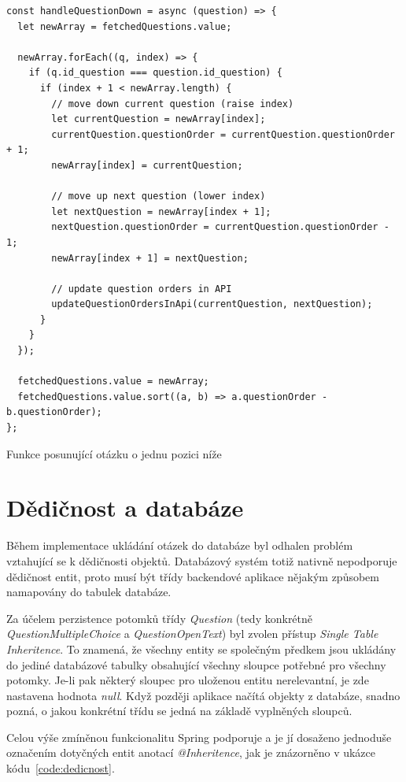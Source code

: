 \begin{listing}[h!]
    \begin{verbatim}
const handleQuestionDown = async (question) => {
  let newArray = fetchedQuestions.value;

  newArray.forEach((q, index) => {
    if (q.id_question === question.id_question) {
      if (index + 1 < newArray.length) {
        // move down current question (raise index)
        let currentQuestion = newArray[index];
        currentQuestion.questionOrder = currentQuestion.questionOrder + 1;
        newArray[index] = currentQuestion;

        // move up next question (lower index)
        let nextQuestion = newArray[index + 1];
        nextQuestion.questionOrder = currentQuestion.questionOrder - 1;
        newArray[index + 1] = nextQuestion;

        // update question orders in API
        updateQuestionOrdersInApi(currentQuestion, nextQuestion);
      }
    }
  });

  fetchedQuestions.value = newArray;
  fetchedQuestions.value.sort((a, b) => a.questionOrder - b.questionOrder);
};

    \end{verbatim}
\caption{Funkce posunující otázku o jednu pozici níže}
\label{code:moveQuestionDown}
\end{listing}

\section{Dědičnost a databáze}
Během implementace ukládání otázek do databáze byl odhalen problém vztahující se k dědičnosti objektů. Databázový systém totiž 
nativně nepodporuje dědičnost entit, proto musí být třídy backendové aplikace nějakým způsobem namapovány do tabulek databáze.

Za účelem perzistence potomků třídy \textit{Question} (tedy konkrétně \textit{QuestionMultipleChoice} a \textit{QuestionOpenText}) byl zvolen přístup \textit{Single Table Inheritence}.
To znamená, že všechny entity se společným předkem jsou ukládány do jediné databázové tabulky obsahující všechny sloupce potřebné pro všechny potomky. 
Je-li pak některý sloupec pro uloženou entitu nerelevantní, je zde nastavena hodnota \textit{null}. Když později aplikace načítá objekty z databáze,
snadno pozná, o jakou konkrétní třídu se jedná na základě vyplněných sloupců.

Celou výše zmíněnou funkcionalitu Spring podporuje a je jí dosaženo jednoduše označením dotyčných entit anotací \textit{@Inheritence}, jak je
znázorněno v ukázce kódu~\ref{code:dedicnost}.

